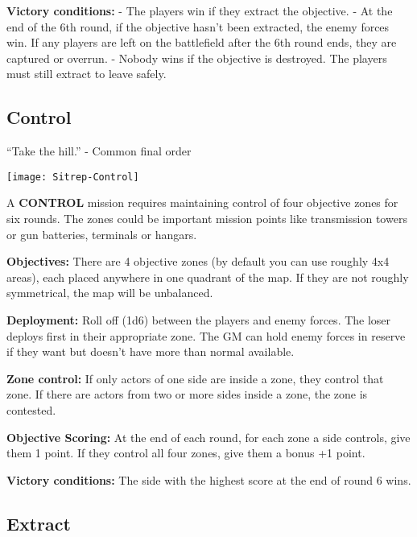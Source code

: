  \textbf{Victory conditions:} 
 - The players win if they extract the objective.
 - At the end of the 6th round, if the objective hasn’t been extracted, the
 enemy forces win. If any players are left on the battlefield after the 6th
 round ends, they are captured or overrun.
 - Nobody wins if the objective is destroyed. The players must still extract to leave safely.
          
 \subsection{Control}

 “Take the hill.” - Common final order

 \begin{center}
   \centering
   \texttt{[image: Sitrep-Control]}
 \end{center}         

        
 A \textbf{CONTROL} mission requires maintaining control of four objective zones
 for six rounds. The zones could be important mission points like transmission
 towers or gun batteries, terminals or hangars.

 \textbf{Objectives:} There are 4 objective zones (by default you can use roughly 4x4
 areas), each placed anywhere in one quadrant of the map. If they are not
 roughly symmetrical, the map will be unbalanced.

 \textbf{Deployment:} Roll off (1d6) between the players and enemy forces. The loser
 deploys first in their appropriate zone. The GM can hold enemy forces in
 reserve if they want but doesn’t have more than normal available.

 \textbf{Zone control:} If only actors of one side are inside a zone, they control that
 zone. If there are actors from two or more sides inside a zone, the zone is
 contested.

 \textbf{Objective Scoring:} At the end of each round, for each zone a side controls,
 give them 1 point. If they control all four zones, give them a bonus +1 point.

 \textbf{Victory conditions:} The side with the highest score at the end of round 6 wins.




\subsection{Extract}


